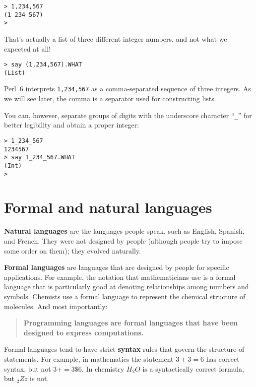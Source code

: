 \begin{verbatim}
> 1,234,567
(1 234 567)
>
\end{verbatim}
%
That's actually a list of three different integer numbers, and 
not what we expected at all! 

\begin{verbatim}
> say (1,234,567).WHAT
(List)
\end{verbatim}

Perl~6 interprets {\tt 1,234,567} as a comma-separated 
sequence of three integers.  As we will see later, 
the comma is a separator used for constructing lists.

You can, however, separate groups of digits with the underscore character ``\verb"_"'' for better legibility and obtain a 
proper integer:

\begin{verbatim}
> 1_234_567
1234567
> say 1_234_567.WHAT
(Int)
>
\end{verbatim}
%




\section{Formal and natural languages}

{\bf Natural languages} are the languages people speak,
such as English, Spanish, and French.  They were not designed
by people (although people try to impose some order on them);
they evolved naturally.

{\bf Formal languages} are languages that are designed by people for
specific applications.  For example, the notation that mathematicians
use is a formal language that is particularly good at denoting
relationships among numbers and symbols.  Chemists use a formal
language to represent the chemical structure of molecules.  And
most importantly:

\begin{quote}
{\bf Programming languages are formal languages that have been
designed to express computations.}
\end{quote}

Formal languages tend to have strict {\bf syntax} rules that
govern the structure of statements.
For example, in mathematics the statement
$3 + 3 = 6$ has correct syntax, but
not $3 + = 3 \$ 6$.  In chemistry
$H_2O$ is a syntactically correct formula, but $_2Zz$ is not.

